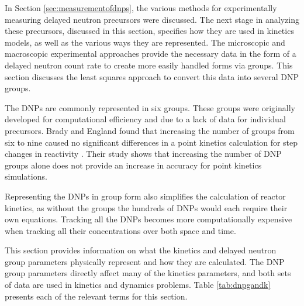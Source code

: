 In Section \ref{sec:measurementofdnps}, the various methods for experimentally measuring delayed neutron precursors were discussed.
The next stage in analyzing these precursors, discussed in this section, specifies how they are used in kinetics models, as well as the various ways they are represented.
The microscopic and macroscopic experimental approaches provide the necessary data in the form of a delayed neutron count rate to create more easily handled forms via groups.
This section discusses the least squares approach to convert this data into several \gls{DNP} groups.

The \glspl{DNP} are commonly represented in six groups.
These groups were originally developed for computational efficiency and due to a lack of data for individual precursors.
Brady and England found that increasing the number of groups from six to nine caused no significant differences in a point kinetics calculation for step changes in reactivity \cite{brady1989delayed}.
Their study shows that increasing the number of \gls{DNP} groups alone does not provide an increase in accuracy for point kinetics simulations.

Representing the \glspl{DNP} in group form also simplifies the calculation of reactor kinetics, as without the groups the hundreds of \glspl{DNP} would each require their own equations.
Tracking all the \glspl{DNP} becomes more computationally expensive when tracking all their concentrations over both space and time.

This section provides information on what the kinetics and delayed neutron group parameters physically represent and how they are calculated.
The \gls{DNP} group parameters directly affect many of the kinetics parameters, and both sets of data are used in kinetics and dynamics problems.
Table \ref{tab:dnpgandk} presents each of the relevant terms for this section.

